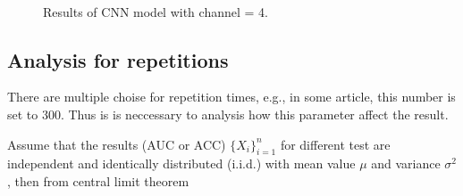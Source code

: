 \documentclass[11pt]{article}
\begin{document}
\begin{figure}[H]
    \centering
     \\
    \caption{Results of CNN model with channel = 4.}
\end{figure}

\subsection{Analysis for repetitions}

There are multiple choise for repetition times, e.g., in some article, this number is set to $300$\cite{Leming2021-on}. Thus is is neccessary to analysis how this parameter affect the result.

Assume that the results (AUC or ACC) $\{X_i\}_{i=1}^n$ for different test are independent and identically distributed (i.i.d.) with mean value $\mu$ and variance $\sigma^2$, then from central limit theorem
\end{document}
